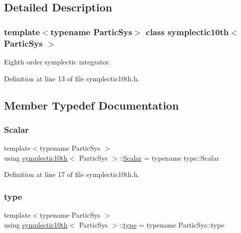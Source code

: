 \subsection{Detailed Description}
\subsubsection*{template$<$typename Partic\+Sys$>$\newline
class symplectic10th$<$ Partic\+Sys $>$}

Eighth order symplectic integrator. 

Definition at line 13 of file symplectic10th.\+h.



\subsection{Member Typedef Documentation}
\mbox{\label{classsymplectic10th_a700bbf7a6116e27ac7c6bfd0cc3018bc}} 
\subsubsection{\texorpdfstring{Scalar}{Scalar}}
{\footnotesize\ttfamily template$<$typename Partic\+Sys $>$ \\
using \mbox{\hyperlink{classsymplectic10th}{symplectic10th}}$<$ Partic\+Sys $>$\+::\mbox{\hyperlink{classsymplectic10th_a700bbf7a6116e27ac7c6bfd0cc3018bc}{Scalar}} =  typename type\+::\+Scalar}



Definition at line 17 of file symplectic10th.\+h.

\mbox{\label{classsymplectic10th_a4fe3f3c6f8e672f40426f52512e083a5}} 
\subsubsection{\texorpdfstring{type}{type}}
{\footnotesize\ttfamily template$<$typename Partic\+Sys $>$ \\
using \mbox{\hyperlink{classsymplectic10th}{symplectic10th}}$<$ Partic\+Sys $>$\+::\mbox{\hyperlink{classsymplectic10th_a4fe3f3c6f8e672f40426f52512e083a5}{type}} =  typename Partic\+Sys\+::type}



